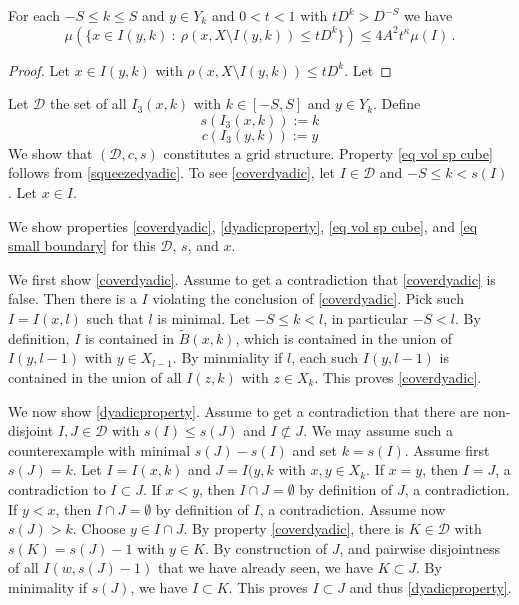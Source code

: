 \begin{lemma}
 For each $-S\le k\le S$ and $y\in Y_k$ and $0<t<1$
 with $tD^k>D^{-S}$ we have
    \begin{equation}
        \label{old small boundary}
        \mu(\{x \in I(y,k) \ : \ \rho(x, X \setminus I(y,k)) \leq t D^{k}\}) \le 4A^2 t^\kappa \mu(I)\,.
    \end{equation}
\end{lemma}
\begin{proof}
Let $x\in I(y,k)$ with  $\rho(x, X \setminus I(y,k)) \leq t D^{k}$. Let

\end{proof}













Let $\mathcal{D}$ the set of all $I_3(x,k)$ with $k\in [-S,S]$ and
$y\in Y_k$. Define
\begin{equation}
s(I_3(x,k)):=k
\end{equation}
\begin{equation}
c(I_3(y,k)):=y
\end{equation}
We show that $(\mathcal{D},c,s)$ constitutes a grid structure. Property \eqref{eq vol sp cube}
follows from \eqref{squeezedyadic}.
To see \eqref{coverdyadic}, let $I\in \mathcal{D}$
and $-S\le k< s(I)$. Let $x\in I$.


We show properties
\eqref{coverdyadic},
\eqref{dyadicproperty},
\eqref{eq vol sp cube}, and \eqref{eq small boundary}
for this $\mathcal {D}$, $s$, and $x$.

We first show \eqref{coverdyadic}.
Assume to get a contradiction that \eqref{coverdyadic}
is false. Then there is a $I$ violating the conclusion of
\eqref{coverdyadic}. Pick such $I=I(x,l)$ such that $l$ is minimal.
Let $-S\le k<l$, in particular $-S<l$.
By definition, $I$ is contained in $\tilde{B}(x,k)$, which
is contained in the union of $I(y,l-1)$ with $y\in X_{l-1}$.
By minmiality if $l$, each such $I(y,l-1)$ is contained in the union of
all $I(z,k)$ with $z\in X_k$. This proves \eqref{coverdyadic}.

We now show \eqref{dyadicproperty}. Assume to get a contradiction that
there are non-disjoint $I, J\in \mathcal{D}$ with $s(I)\le s(J)$
and $I \not \subset J$. We may assume such a counterexample with minimal
$s(J)-s(I)$ and set $k=s(I)$. Assume first $s(J)=k$. Let $I=I(x,k)$ and $J=I(y,k$
with $x,y\in X_k$. If $x=y$, then $I=J$, a contradiction to $I\subset J$.
If $x<y$, then $I\cap J=\emptyset$ by definition of $J$, a contradiction.
If $y<x$, then $I\cap J=\emptyset$ by definition of $I$, a contradiction.
Assume now $s(J)>k$. Choose $y\in I\cap J$. By property \eqref{coverdyadic},
there is $K\in \mathcal{D}$ with $s(K)=s(J)-1$ with $y\in K$. By construction
of $J$, and pairwise disjointness of all $I(w,s(J)-1)$ that we have already seen,
we have $K\subset J$. By minimality if $s(J)$, we have $I\subset K$.
This proves $I\subset J$ and thus \eqref{dyadicproperty}.


